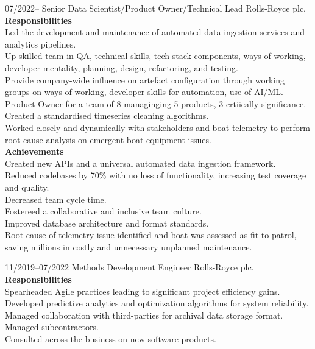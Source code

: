 \documentclass[8pt]{developercv}
\begin{document}
\begin{entrylist}
	\entry
	{07/2022--}
	{Senior Data Scientist/Product Owner/Technical Lead}
	{Rolls-Royce plc.}
	{
		\textbf{Responsibilities}\\
		Led the development and maintenance of automated data ingestion services and
		analytics pipelines.\\
		Up-skilled team in QA, technical skills, tech stack components, ways of
		working, developer mentality, planning, design, refactoring, and testing.\\
		Provide company-wide influence on artefact configuration through working
		groups on ways of working, developer skills for automation, use of AI/ML.\\
		Product Owner for a team of 8 managinging 5 products, 3 crtiically significance.\\
		Created a standardised timeseries cleaning algorithms.\\
		Worked closely and dynamically with stakeholders and boat telemetry to
		perform root cause analysis on emergent boat equipment issues.\\

		\textbf{Achievements}\\
		Created new APIs and a universal automated data ingestion framework.\\
		Reduced codebases by 70\% with no loss of functionality, increasing test
		coverage and quality.\\
		Decreased team cycle time.\\
		Fostereed a collaborative and inclusive team culture.\\
		Improved database architecture and format standards.\\
		Root cause of telemetry issue identified and boat was assessed as fit to
		patrol, saving millions in costly and unnecessary unplanned maintenance.
	}

	\entry
	{11/2019--07/2022}
	{Methods Development Engineer}
	{Rolls-Royce plc.}
	{
		\textbf{Responsibilities}\\
		Spearheaded Agile practices leading to significant project efficiency gains.\\
		Developed predictive analytics and optimization algorithms for system reliability.\\
		Managed collaboration with third-parties for archival data storage format.\\
		Managed subcontractors.\\
		Consulted across the business on new software products.\\

}
\end{entrylist}
\end{document}
